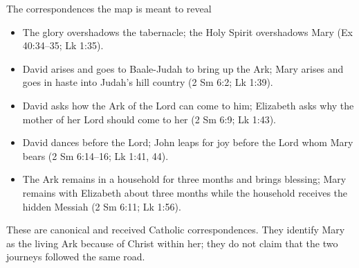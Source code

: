 \begin{studybox}{The correspondences the map is meant to reveal}
\begin{itemize}
  \item The glory overshadows the tabernacle; the Holy Spirit overshadows
        Mary (Ex 40:34--35; Lk 1:35).
  \item David arises and goes to Baale-Judah to bring up the Ark; Mary arises
        and goes in haste into Judah's hill country (2 Sm 6:2; Lk 1:39).
  \item David asks how the Ark of the Lord can come to him; Elizabeth asks
        why the mother of her Lord should come to her (2 Sm 6:9; Lk 1:43).
  \item David dances before the Lord; John leaps for joy before the Lord whom
        Mary bears (2 Sm 6:14--16; Lk 1:41, 44).
  \item The Ark remains in a household for three months and brings blessing;
        Mary remains with Elizabeth about three months while the household
        receives the hidden Messiah (2 Sm 6:11; Lk 1:56).
\end{itemize}
These are canonical and received Catholic correspondences.  They identify
Mary as the living Ark because of Christ within her; they do not claim that
the two journeys followed the same road.
\end{studybox}
